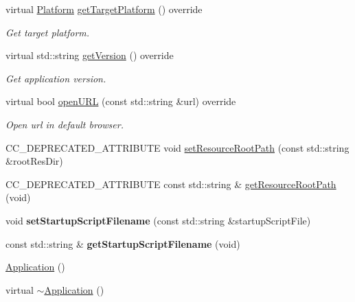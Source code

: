 \begin{DoxyCompactItemize}
\mbox{\label{classApplication_ab28ac2b31e12cd16e157eeee710ef4a4}} 
virtual \hyperlink{classApplicationProtocol_aff3819b9b879107dc9c207d0e7ae36d1}{Platform} \hyperlink{classApplication_ab28ac2b31e12cd16e157eeee710ef4a4}{get\+Target\+Platform} () override
\begin{DoxyCompactList}\small\item\em Get target platform. \end{DoxyCompactList}\item 
\mbox{\label{classApplication_ade1db7f4ab2a9e2b1aeb7950ac481ebd}} 
virtual std\+::string \hyperlink{classApplication_ade1db7f4ab2a9e2b1aeb7950ac481ebd}{get\+Version} () override
\begin{DoxyCompactList}\small\item\em Get application version. \end{DoxyCompactList}\item 
virtual bool \hyperlink{classApplication_a13ccf5ab932de8a22255b56d085bed59}{open\+U\+RL} (const std\+::string \&url) override
\begin{DoxyCompactList}\small\item\em Open url in default browser. \end{DoxyCompactList}\item 
C\+C\+\_\+\+D\+E\+P\+R\+E\+C\+A\+T\+E\+D\+\_\+\+A\+T\+T\+R\+I\+B\+U\+TE void \hyperlink{classApplication_a0df1abee182d6a9f3d2a318941aace4f}{set\+Resource\+Root\+Path} (const std\+::string \&root\+Res\+Dir)
\item 
C\+C\+\_\+\+D\+E\+P\+R\+E\+C\+A\+T\+E\+D\+\_\+\+A\+T\+T\+R\+I\+B\+U\+TE const std\+::string \& \hyperlink{classApplication_a669e0584fa243449d87b17bc31d19113}{get\+Resource\+Root\+Path} (void)
\item 
\mbox{\label{classApplication_a3877f2df945dac6061ff493b12409827}} 
void {\bfseries set\+Startup\+Script\+Filename} (const std\+::string \&startup\+Script\+File)
\item 
\mbox{\label{classApplication_ad3cc654f59314213062596845d70f865}} 
const std\+::string \& {\bfseries get\+Startup\+Script\+Filename} (void)
\item 
\hyperlink{classApplication_afa8cc05ce6b6092be5ecdfdae44e05f8}{Application} ()
\item 
virtual \hyperlink{classApplication_a20573928a0d53fb96d929513bc5acde6}{$\sim$\+Application} ()

\end{DoxyCompactItemize}
